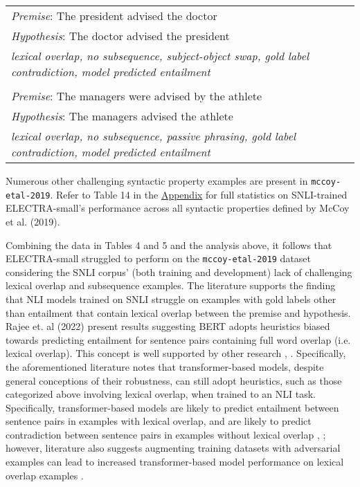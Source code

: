 \documentclass[11pt,a4paper]{article}
\begin{document}
\begin{table}[hbt!]
\begin{center}
\tiny
\begin{tabular}{p{} p{}}

\textit{Premise}: The president advised the doctor \\
\textit{Hypothesis}: The doctor advised the president \\
\textit{lexical overlap, no subsequence, subject-object swap, gold label contradiction, model predicted entailment} \\

\\

\textit{Premise}: The managers were advised by the athlete \\
\textit{Hypothesis}: The managers advised the athlete \\
\textit{lexical overlap, no subsequence, passive phrasing, gold label contradiction, model predicted entailment}

\end{tabular}
\end{center}
\end{table}

Numerous other challenging syntactic property examples are present in \texttt{mccoy-etal-2019}. Refer to Table 14 in the \hyperref[sec:appendix]{Appendix} for full statistics on SNLI-trained ELECTRA-small's performance across all syntactic properties defined by McCoy et al. (2019).

Combining the data in Tables 4 and 5 and the analysis above, it follows that ELECTRA-small struggled to perform on the \texttt{mccoy-etal-2019} dataset considering the SNLI corpus' (both training and development) lack of challenging lexical overlap and subsequence examples. The literature supports the finding that NLI models trained on SNLI struggle on examples with gold labels other than entailment that contain lexical overlap between the premise and hypothesis. Rajee et. al (2022)  present results suggesting BERT adopts heuristics biased towards predicting entailment for sentence pairs containing full word overlap (i.e. lexical overlap). This concept is well supported by other research \cite{zhou-bansal-2020-towards}, \cite{mendelson-belinkov-2021-debiasing}. Specifically, the aforementioned literature notes that transformer-based models, despite general conceptions of their robustness, can still adopt heuristics, such as those categorized above involving lexical overlap, when trained to an NLI task. Specifically, transformer-based models are likely to predict entailment between sentence pairs in examples with lexical overlap, and are likely to predict contradiction between sentence pairs in examples without lexical overlap \cite{naik-etal-2018-stress}, \cite{https://doi.org/10.48448/y3fv-1347}; however, literature also suggests augmenting training datasets with adversarial examples can lead to increased transformer-based model performance on lexical overlap examples \cite{DBLP:journals/corr/abs-1902-01007}. 
\end{document}
